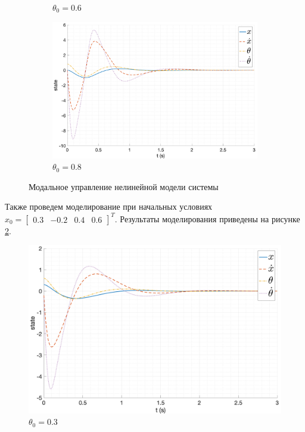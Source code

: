 \begin{figure}[ht!]
\begin{subfigure}[b]{0.45\textwidth}
        \caption{$\theta_0 = 0.6$}
    \end{subfigure}
    \begin{subfigure}[b]{0.45\textwidth}
        \includegraphics[width=\textwidth]{media/plots/nonmodal_control/state_4.png}
        \caption{$\theta_0 = 0.8$}
    \end{subfigure}
    \caption{Модальное управление нелинейной модели системы}
    \label{fig:nonmodal_control_initials}
\end{figure}

Также проведем моделирование при начальных условиях $x_0 = \begin{bmatrix} 0.3 & -0.2 & 0.4 & 0.6 \end{bmatrix}^T$. Результаты
моделирования приведены на рисунке \ref{fig:nonmodal_control_initials_2}.
\begin{figure}[ht!]
    \centering
    \includegraphics[width=\textwidth]{media/plots/nonmodal_control/state_5.png}
    \caption{$\theta_0 = 0.3$}
    \label{fig:nonmodal_control_initials_2}
\end{figure}
\FloatBarrier


